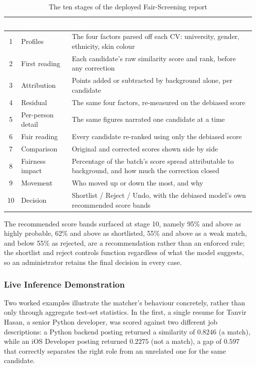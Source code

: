 \documentclass[11pt,a4paper]{article}
\newcommand{\hdrow}{\rowcolor{TPnavy}}
\newcommand{\hdtxt}[1]{\textcolor{white}{\bfseries #1}}
\begin{document}
\begin{table}[H]
\centering
\caption{The ten stages of the deployed Fair-Screening report}
\label{tab:mod1-report}
\small
\begin{tabular}{cp{3.2cm}p{9.4cm}}
\toprule
\hdrow \hdtxt{\#} & \hdtxt{Stage} & \hdtxt{Content} \\
\midrule
1 & Profiles & The four factors parsed off each CV: university, gender, ethnicity, skin colour \\
\rowcolor{TPlight}
2 & First reading & Each candidate's raw similarity score and rank, before any correction \\
3 & Attribution & Points added or subtracted by background alone, per candidate \\
\rowcolor{TPlight}
4 & Residual & The same four factors, re-measured on the debiased score \\
5 & Per-person detail & The same figures narrated one candidate at a time \\
\rowcolor{TPlight}
6 & Fair reading & Every candidate re-ranked using only the debiased score \\
7 & Comparison & Original and corrected scores shown side by side \\
\rowcolor{TPlight}
8 & Fairness impact & Percentage of the batch's score spread attributable to background, and how much the correction closed \\
9 & Movement & Who moved up or down the most, and why \\
\rowcolor{TPlight}
10 & Decision & Shortlist / Reject / Undo, with the debiased model's own recommended score bands \\
\bottomrule
\end{tabular}
\end{table}

The recommended score bands surfaced at stage 10, namely 95\% and above as highly probable, 62\% and above as shortlisted, 55\% and above as a weak match, and below 55\% as rejected, are a recommendation rather than an enforced rule; the shortlist and reject controls function regardless of what the model suggests, so an administrator retains the final decision in every case.

\subsubsection{Live Inference Demonstration}

Two worked examples illustrate the matcher's behaviour concretely, rather than only through aggregate test-set statistics. In the first, a single resume for Tanvir Hasan, a senior Python developer, was scored against two different job descriptions: a Python backend posting returned a similarity of $0.8246$ (a match), while an iOS Developer posting returned $0.2275$ (not a match), a gap of $0.597$ that correctly separates the right role from an unrelated one for the same candidate.
\end{document}
